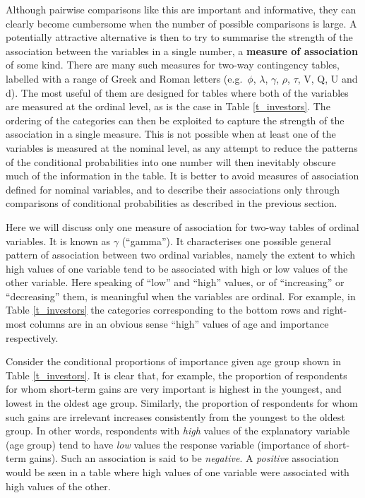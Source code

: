 Although pairwise comparisons like this are important
and informative, they can clearly become cumbersome when the
number of possible comparisons is large. A potentially attractive
alternative is then to try to summarise the strength of the association
between the variables in a single number, a \textbf{measure
of association} of some kind. There are many such measures for
two-way contingency tables, labelled with a range of Greek and Roman letters (e.g.\
$\phi$, $\lambda$, $\gamma$, $\rho$, $\tau$, V, Q, U and d).
The most useful of them are
designed for tables where both of the variables are measured at the
ordinal level, as is the case in Table \ref{t_investors}.
The ordering of the categories can then be exploited to
capture the strength of the association in a single measure. This is
not possible when at least one of the variables is measured at the
nominal level, as any attempt to reduce the patterns of the conditional
probabilities into one number will then inevitably obscure much of the
information in the table. It is better to avoid measures of
association defined for nominal variables, and to describe their
associations only through comparisons of conditional
probabilities as described in the previous section.

Here we will discuss only one measure of association for two-way tables
of ordinal variables. It is known as $\gamma$ (``gamma''). It
characterises one possible general pattern of association between two
ordinal variables, namely the extent to which high values of one
variable tend to be associated with high or low values of the other
variable. Here speaking of ``low'' and ``high'' values,
or of ``increasing'' or ``decreasing'' them, is meaningful when
the variables are ordinal. For example, in Table \ref{t_investors} the
categories corresponding to the bottom rows and right-most columns are
in an obvious sense ``high'' values of age and importance respectively.

Consider the conditional proportions of importance given age group shown
in Table \ref{t_investors}. It is clear that, for example, the
proportion of respondents for whom short-term gains are very important
is highest in the youngest, and lowest in the oldest age group.
Similarly, the proportion of respondents for whom such gains are
irrelevant increases consistently from the youngest to the oldest group.
In other words, respondents with \emph{high} values of the explanatory
variable (age group) tend to have \emph{low} values the response
variable (importance of short-term gains). Such an association is said
to be \emph{negative}. A \emph{positive} association would be seen in a
table where high values of one variable were associated with high values
of the other.

